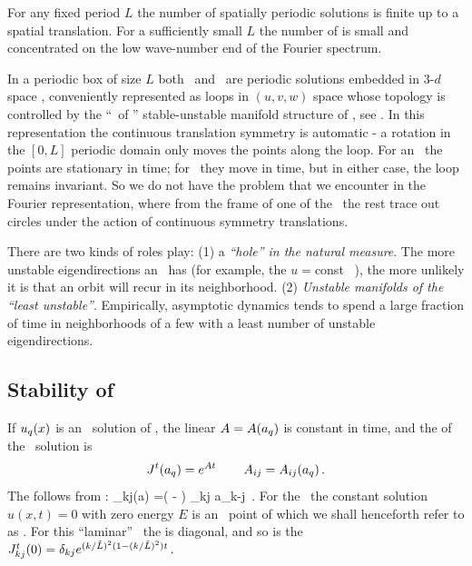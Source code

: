 For any fixed period $L$ the number
of spatially periodic solutions is finite up to a spatial translation.
For a sufficiently small $L$
the number of {\eqva} is small and
concentrated on the low wave-number end of the Fourier spectrum.

In a periodic box of size $L$
both \eqva\ and \reqva\ are  periodic solutions
embedded in 3-$d$ space ,
conveniently represented as loops in
$(u,v,w)$ space whose topology is controlled by the
``\eqva\ of \eqva'' stable-unstable manifold structure of
, see .
In this representation the continuous translation symmetry
is automatic - a rotation in the $[0,L]$ periodic domain only
moves the points along the loop. For an \eqv\ the points
are stationary in time; for \reqv\ they move in time, but in
either case, the loop remains invariant.
So we do not have the problem that we encounter in the Fourier
representation, where from the frame of one of the \eqva\
the rest trace out circles under the action of continuous symmetry
translations.

%
There are two kinds of roles
{\eqva} play:
(1)
a {\em ``hole'' in the natural measure}.
The more unstable eigendirections an \eqv\ has (for example, the
$u=$const \eqv~\EQV{0}), the more unlikely it is  that
an orbit will recur in its neighborhood.
(2)
{\em Unstable manifolds of the ``least unstable''{\eqva}}.
Empirically, asymptotic dynamics tends to spend
a large fraction of time in
neighborhoods of a few  {\eqva} with
a least number of unstable eigendirections.



\subsection{Stability of \eqva}
\label{s:StabEqui}

If $u_q(x)$ is an \eqv\ solution of \KSe,
the linear {\stabmat}
${A}={A}(a_q)$
is constant in time,
and
the {\jacobianM}
of the \eqv\ solution is
\[
 {J}^t(a_q) = e^{{A} t}
    \,\qquad
 A_{ij}= A_{ij}(a_q)
\,.
\]
The {\stabmat}
follows from :
\beq
{\Mvar}_{kj}(a) %
=\left(  -   \right)
  \delta_{kj}  a_{k-j}
\,.
For the \KSe\ the constant solution $u(x,t)=0$ with zero energy $E$ is an
\eqv\ point of \refeq{ks} which we shall henceforth refer to as
. For this ``laminar'' \eqv\ the {\stabmat}
is diagonal, and
so is the {\jacobianM}
$
{J}^t_{kj}(0) = \delta_{kj} e^{(k/\tilde{L})^2(1- (k/\tilde{L})^2)t}
\,.
$


